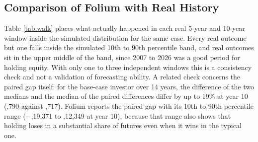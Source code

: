 \subsection{Comparison of Folium with Real History}
\begin{table}[H]
\centering
\small
{}
\caption{Walk-forward replay of a fund up 30\% through every real window}
\label{tab:walk}
\end{table}

Table \ref{tab:walk} places what actually happened in each real 5-year and 10-year window inside the simulated distribution for the same case. Every real outcome but one falls inside the simulated 10th to 90th percentile band, and real outcomes sit in the upper middle of the band, since 2007 to 2026 was a good period for holding equity. With only one to three independent windows this is a consistency check and not a validation of forecasting ability. A related check concerns the paired gap itself: for the base-case investor over 14 years, the difference of the two medians and the median of the paired differences differ by up to 19\% at year 10 (,790 against ,717). Folium reports the paired gap with its 10th to 90th percentile range ($-$,19,371 to ,12,349 at year 10), because that range also shows that holding loses in a substantial share of futures even when it wins in the typical one.

